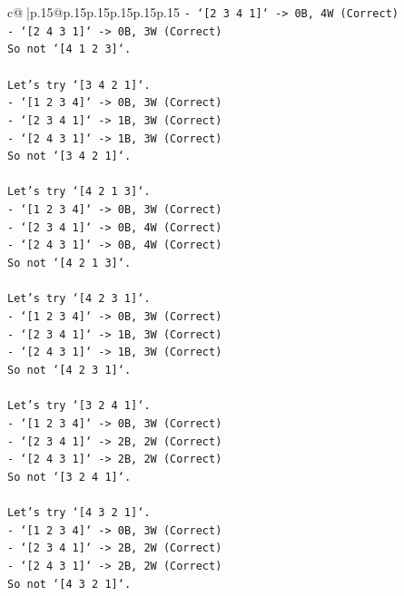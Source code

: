 \documentclass{article}
\begin{document}
{\begin{supertabular}{c@{$\;$}|p{.15\linewidth}@{}p{.15\linewidth}p{.15\linewidth}p{.15\linewidth}p{.15\linewidth}p{.15\linewidth}}
{{{\texttt{{-} `{[}2 3 4 1{]}` {-}> 0B, 4W (Correct)} \\
\texttt{{-} `{[}2 4 3 1{]}` {-}> 0B, 3W (Correct)} \\
\texttt{So not `{[}4 1 2 3{]}`.} \\
\\ 
\texttt{Let's try `{[}3 4 2 1{]}`.} \\
\texttt{{-} `{[}1 2 3 4{]}` {-}> 0B, 3W (Correct)} \\
\texttt{{-} `{[}2 3 4 1{]}` {-}> 1B, 3W (Correct)} \\
\texttt{{-} `{[}2 4 3 1{]}` {-}> 1B, 3W (Correct)} \\
\texttt{So not `{[}3 4 2 1{]}`.} \\
\\ 
\texttt{Let's try `{[}4 2 1 3{]}`.} \\
\texttt{{-} `{[}1 2 3 4{]}` {-}> 0B, 3W (Correct)} \\
\texttt{{-} `{[}2 3 4 1{]}` {-}> 0B, 4W (Correct)} \\
\texttt{{-} `{[}2 4 3 1{]}` {-}> 0B, 4W (Correct)} \\
\texttt{So not `{[}4 2 1 3{]}`.} \\
\\ 
\texttt{Let's try `{[}4 2 3 1{]}`.} \\
\texttt{{-} `{[}1 2 3 4{]}` {-}> 0B, 3W (Correct)} \\
\texttt{{-} `{[}2 3 4 1{]}` {-}> 1B, 3W (Correct)} \\
\texttt{{-} `{[}2 4 3 1{]}` {-}> 1B, 3W (Correct)} \\
\texttt{So not `{[}4 2 3 1{]}`.} \\
\\ 
\texttt{Let's try `{[}3 2 4 1{]}`.} \\
\texttt{{-} `{[}1 2 3 4{]}` {-}> 0B, 3W (Correct)} \\
\texttt{{-} `{[}2 3 4 1{]}` {-}> 2B, 2W (Correct)} \\
\texttt{{-} `{[}2 4 3 1{]}` {-}> 2B, 2W (Correct)} \\
\texttt{So not `{[}3 2 4 1{]}`.} \\
\\ 
\texttt{Let's try `{[}4 3 2 1{]}`.} \\
\texttt{{-} `{[}1 2 3 4{]}` {-}> 0B, 3W (Correct)} \\
\texttt{{-} `{[}2 3 4 1{]}` {-}> 2B, 2W (Correct)} \\
\texttt{{-} `{[}2 4 3 1{]}` {-}> 2B, 2W (Correct)} \\
\texttt{So not `{[}4 3 2 1{]}`.} \\
}}}
\end{supertabular}}
\end{document}
